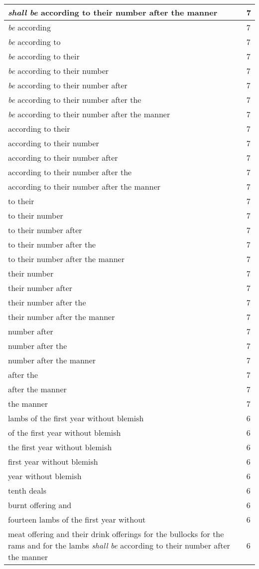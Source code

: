 \begin{center}
\begin{longtable}{|p{3.0in}|p{0.5in}|}
\emph{shall} \emph{be} according to their number after the manner & 7\\ \hline 
\emph{be} according & 7\\ \hline 
\emph{be} according to & 7\\ \hline 
\emph{be} according to their & 7\\ \hline 
\emph{be} according to their number & 7\\ \hline 
\emph{be} according to their number after & 7\\ \hline 
\emph{be} according to their number after the & 7\\ \hline 
\emph{be} according to their number after the manner & 7\\ \hline 
according to their & 7\\ \hline 
according to their number & 7\\ \hline 
according to their number after & 7\\ \hline 
according to their number after the & 7\\ \hline 
according to their number after the manner & 7\\ \hline 
to their & 7\\ \hline 
to their number & 7\\ \hline 
to their number after & 7\\ \hline 
to their number after the & 7\\ \hline 
to their number after the manner & 7\\ \hline 
their number & 7\\ \hline 
their number after & 7\\ \hline 
their number after the & 7\\ \hline 
their number after the manner & 7\\ \hline 
number after & 7\\ \hline 
number after the & 7\\ \hline 
number after the manner & 7\\ \hline 
after the & 7\\ \hline 
after the manner & 7\\ \hline 
the manner & 7\\ \hline 
lambs of the first year without blemish & 6\\ \hline 
of the first year without blemish & 6\\ \hline 
the first year without blemish & 6\\ \hline 
first year without blemish & 6\\ \hline 
year without blemish & 6\\ \hline 
tenth deals & 6\\ \hline 
burnt offering and & 6\\ \hline 
fourteen lambs of the first year without & 6\\ \hline 
meat offering and their drink offerings for the bullocks for the rams and for the lambs \emph{shall} \emph{be} according to their number after the manner & 6\\ \hline 


\end{longtable}
\end{center}
